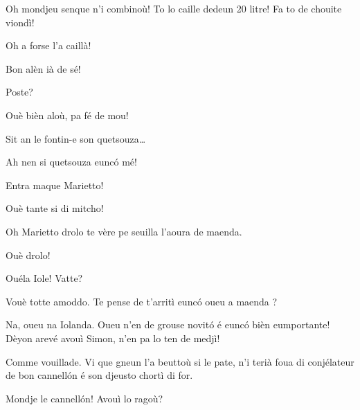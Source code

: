 \begin{drama}
\Sahlammspeaks Oh mondjeu senque n'i combinoù! To lo caille dedeun 20 litre! Fa to de chouite viondì!


\Sahlammspeaks Oh a forse l'a caillà!


\Sahlammspeaks Bon alèn ià de sé!


\Cienspeaks {} Poste?

\Sahlammspeaks Ouè bièn aloù, pa fé de mou!


\Cienspeaks {} Sit an le fontin-e son quetsouza\ldots

\Marietto Ah nen si quetsouza eunc\'o mé!


\Cienspeaks Entra maque Marietto!

\Mariettospeaks Ouè tante si di mitcho!




\Iolandaspeaks Oh Marietto drolo te vère pe seuilla l’aoura de maenda.

\Cienspeaks Ouè drolo!

\Mariettospeaks Ouéla Iole! Vatte?

\Iolandaspeaks Vouè totte amoddo. Te pense de t’arritì eunc\'o oueu a maenda ?


\Cienspeaks Na, oueu na Iolanda. Oueu n’en de grouse novit\'o é eunc\'o bièn eumportante! Dèyon arevé avouì Simon, n'en pa lo ten de medjì!

\Iolandaspeaks Comme vouillade. Vi que gneun l'a beuttoù si le pate, n’i terià foua di conjélateur  de bon cannell\'on é son djeusto chortì di for.

\Mariettospeaks Mondje le cannell\'on! Avouì lo ragoù?


\end{drama}
